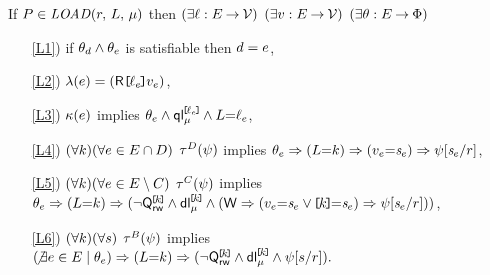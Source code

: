 \noindent
If $\aPS \in \sLOAD[\amode]{\aReg}{\cExp}$ then
$(\exists\ell:E\mathbin\rightarrow\mathcal{V})$
$(\exists v:E\mathbin\rightarrow\mathcal{V})$
$(\exists\theta:E\mathbin\rightarrow\Phi)$
\begin{enumerate}
\item[\ref{L1})] if $\theta_d\land\theta_e$ is satisfiable then $d=e$,
\item[\ref{L2})] $\labelingAct(\aEv) = \DRREFP{\cVal_\aEv}{\aVal_\aEv}$,
\item[\ref{L3})] $\kappa(e)$ implies
  \begin{math}
    \theta_e
    \land \mathsf{ql}_{\mu}^{\mkern-2mu\texttt{[}\mkern-2mu\ell_e \mkern-2mu\texttt{]}\mkern-2mu}
    \land L{=}\ell_e
  \end{math},
\item[\ref{L4})]
  \begin{math}
    (\forall k)
    (\forall e\in E\cap D)
  \end{math}
  $\aTr{\bEvs}{\bForm}$ implies
  \begin{math}
    \cForm_\aEv
    \limplies (\cExp{=}\dVal)
    \limplies (\aVal_\aEv{=}\uReg{\aEv})
    \limplies \bForm[\uReg{\aEv}/\aReg]%
  \end{math},
  \makebox[5.75cm]{}
\item[\ref{L5})] 
  \begin{math}
    (\forall k)
    (\forall e\in E\setminus C)
  \end{math}
  $\aTr{\cEvs}{\bForm}$ implies
  \begin{math}
    \cForm_\aEv
    \limplies (\cExp{=}\dVal)
    \limplies \PBR{        
      \lnot\QxREF{\dVal}
      \land\DL{\REF{\dVal}}{\amode}
      \land
      (\RW
      \limplies (\aVal_\aEv{=}\uReg{\aEv}\lor\REF{\dVal}{=}\uReg{\aEv}) 
      \limplies \bForm[\uReg{\aEv}/\aReg]%
      )
    }      
  \end{math},
\item[\ref{L6})] %
  \begin{math}
    (\forall k)
    (\forall s)
  \end{math}
  $\aTr{\dEvs}{\bForm}$  implies 
  \begin{math}
    (\!\not\exists\aEv\in\aEvs \suchthat \cForm_\aEv)
    \limplies (\cExp{=}\dVal)
    \limplies \PBR{        
      \lnot\QxREF{\dVal}
      \land \DL{\REF{\dVal}}{\amode}
      \land \bForm[\bReg/\aReg]%
    }.
  \end{math}
\end{enumerate}  
